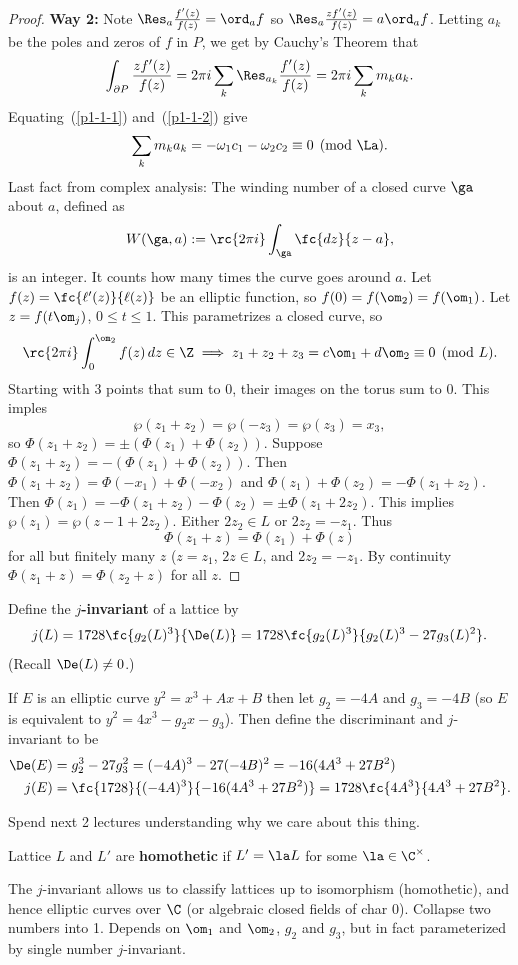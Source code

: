 \begin{proof}
\textbf{Way 2:}
Note $\Res_a \frac{f'(z)}{f(z)}=\ord_a f$ so $\Res_a \frac{zf'(z)}{f(z)}=a \ord_a f$. Letting $a_k$ be the poles and zeros of $f$ in $P$, we get by Cauchy's Theorem that
\begin{equation}\label{p1-1-2}
\int_{\partial P} \frac{zf'(z)}{f(z)}=2\pi i\sum_{k} \Res_{a_k} \frac{f'(z)}{f(z)}=2\pi i \sum_{k}m_k a_k.
\end{equation}
Equating~(\ref{p1-1-1}) and~(\ref{p1-1-2}) give
\[
\sum_{k}m_ka_k=-\omega_1c_1-\omega_2c_2\equiv 0\pmod{\La}.
\]
Last fact from complex analysis: The winding number of a closed curve $\ga$ about $a$, defined as
\[
W(\ga,a):=\rc{2\pi i}\int_{\ga}\fc{dz}{z-a},
\]
is an integer. It counts how many times the curve goes around $a$. Let $f(z)=\fc{\ell'(z)}{\ell(z)}$ be an elliptic function, so $f(0)=f(\om_2)=f(\om_1)$. Let $z=f(t\om_j)$, $0\le t\le 1$. This parametrizes a closed curve, so
\[
\rc{2\pi i}\int_0^{\om_2}f(z)\,dz\in \Z\implies z_1+z_2+z_3=c\om_1+d\om_2\equiv 0\pmod L.
\]
Starting with 3 points that sum to 0, their images on the torus sum to 0. %
This imples 
\[
\wp(z_1+z_2)=\wp(-z_3)=\wp(z_3)=x_3,
\]
so $\Phi(z_1+z_2)=\pm(\Phi(z_1)+\Phi(z_2))$. Suppose $\Phi(z_1+z_2)=-(\Phi(z_1)+\Phi(z_2))$. Then $\Phi(z_1+z_2)=\Phi(-x_1)+\Phi(-x_2)$ and $\Phi(z_1)+\Phi(z_2)=-\Phi(z_1+z_2)$. Then $\Phi(z_1)=-\Phi(z_1+z_2)-\Phi(z_2)=\pm \Phi(z_1+2z_2)$. This implies $\wp(z_1)=\wp(z-1+2z_2)$. Either $2z_2\in L$ or $2z_2=-z_1$. Thus
\[
\Phi(z_1+z)=\Phi(z_1)+\Phi(z)
\]
for all but finitely many $z$ ($z=z_1$, $2z\in L$, and $2z_2=-z_1$. By continuity $\Phi(z_1+z)=\Phi(z_2+z)$ for all $z$.\end{proof}
\begin{df}
Define the \textbf{$j$-invariant} of a lattice by
\[
j(L)=1728\fc{g_2(L)^3}{\De(L)}=1728\fc{g_2(L)^3}{g_2(L)^3-27g_3(L)^2}.
\]
(Recall $\De(L)\ne 0$.)

If $E$ is an elliptic curve $y^2=x^3+Ax+B$ then let $g_2=-4A$ and $g_3=-4B$ (so $E$ is equivalent to $y^2=4x^3-g_2x-g_3$). Then define the discriminant and $j$-invariant to be
\begin{align*}
\De(E)&=g_2^3-27g_3^2=(-4A)^3-27(-4B)^2=-16(4A^3+27B^2)\\
j(E)&=\fc{1728}{(-4A)^3}{-16(4A^3+27B^2)}=1728\fc{4A^3}{4A^3+27B^2}.
\end{align*}
\end{df}
Spend next 2 lectures understanding why we care about this thing.

\begin{df}
Lattice $L$ and $L'$ are \textbf{homothetic} if $L'=\la L$ for some $\la\in \C^{\times}$.
\end{df}
The $j$-invariant allows us to classify lattices up to isomorphism (homothetic), and hence elliptic curves over $\C$ (or algebraic closed fields of char 0).
Collapse two numbers into 1. Depends on $\om_1$ and $\om_2$, $g_2$ and $g_3$, but in fact parameterized by single number $j$-invariant. 

